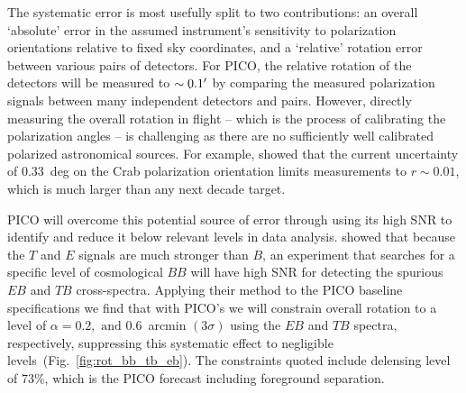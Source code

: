 \documentclass[PICOReport.tex]{subfiles}
\begin{document}
The systematic error is most usefully split to two contributions: an overall `absolute' error in the assumed instrument's sensitivity to polarization orientations relative to fixed sky coordinates, and a `relative' rotation error between various pairs of detectors. For PICO, the relative rotation of the detectors will be measured to $\sim 0.1'$ by comparing the measured polarization signals between many independent detectors and pairs. However, directly measuring the overall rotation in flight -- which is the process of calibrating the polarization angles --  is challenging as there are no sufficiently well calibrated polarized astronomical sources. For example, \citet{Aumont+2018} showed that the current uncertainty of $0.33$~deg on the Crab polarization orientation limits measurements to $r \sim 0.01$, which is much larger than any next decade target. 

PICO will overcome this potential source of error through using its high \ac{SNR} to identify and reduce it below relevant levels in data analysis. \citet{yadav} showed that because the $T$ and $E$ signals are much stronger than $B$, an experiment that searches for a specific level of cosmological $BB$ will have high \ac{SNR} for detecting the spurious $EB$ and $TB$ cross-spectra. Applying their method to the PICO baseline specifications we find that with PICO's we will constrain overall rotation to a level of $\alpha=0.2, \,\, \mbox{and}\,\, 0.6$~arcmin $(3\sigma)$ using the $EB$ and $TB$ spectra, respectively, suppressing this systematic effect to negligible levels~(Fig.~\ref{fig:rot_bb_tb_eb}). The constraints quoted include delensing level of 73\%, which is the PICO forecast including foreground separation. 



\end{document}

